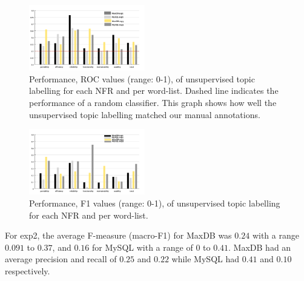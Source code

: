 \documentclass[]{sig-alternate}
\begin{document}
\begin{figure}
  \centering
 \includegraphics[width=0.45\textwidth]{figures/unsupervised-bar}
 \caption{Performance, ROC values (range: 0-1), of unsupervised topic labelling for
   each NFR and per word-list. Dashed line indicates the performance of a random classifier. This graph shows how well the
   unsupervised topic labelling matched our manual annotations.}

  \label{fig:maxdb-unsup-results}
\end{figure}

\begin{figure}
  \centering
 \includegraphics[width=0.45\textwidth]{figures/unsupervised-bar-f1}
 \caption{Performance, F1 values (range: 0-1), of unsupervised topic labelling for
   each NFR and per word-list.}
  \label{fig:maxdb-unsup-results-f1}
\end{figure}



For \textsf{exp2}, the average F-measure (macro-F1) for MaxDB was $0.24$ with a range $0.091$ to
$0.37$, and $0.16$ for MySQL with a range of $0$ to $0.41$.
MaxDB had an average precision and recall of $0.25$ and $0.22$
while MySQL had $0.41$ and $0.10$ respectively.
\end{document}
